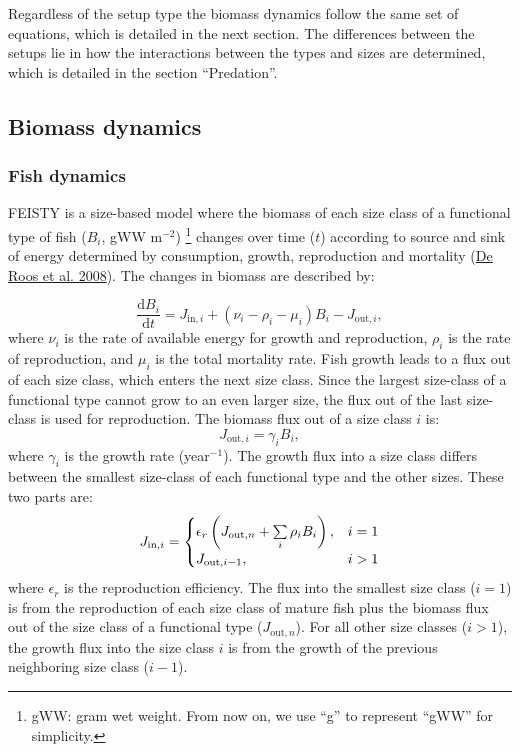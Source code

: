 \documentclass[
]{article}
\begin{document}
Regardless of the setup type the biomass dynamics follow the same set of
equations, which is detailed in the next section. The differences
between the setups lie in how the interactions between the types and
sizes are determined, which is detailed in the section ``Predation''.

\hypertarget{biomass-dynamics}{%
\subsection{Biomass dynamics}\label{biomass-dynamics}}

\hypertarget{fish-dynamics}{%
\subsubsection{Fish dynamics}\label{fish-dynamics}}

FEISTY is a size-based model where the biomass of each size class of a
functional type of fish (\(B_i\), gWW m\(^{-2}\)) \footnote{gWW: gram
  wet weight. From now on, we use ``g'' to represent ``gWW'' for
  simplicity.} changes over time (\(t\)) according to source and sink of
energy determined by consumption, growth, reproduction and mortality
(\protect\hyperlink{ref-deRoos2008}{De Roos et al. 2008}). The changes
in biomass are described by:

\begin{equation}
\dfrac{\mathrm{d}B_{i}}{\mathrm{d}t} =  J_{\mathrm{in},i}  + (\nu_{i} - \rho_i -\mu_i)B_i - J_{\mathrm{out},i},
\end{equation} where \(\nu_{i}\) is the rate of available energy for
growth and reproduction, \(\rho_i\) is the rate of reproduction, and
\(\mu_i\) is the total mortality rate. Fish growth leads to a flux out
of each size class, which enters the next size class. Since the largest
size-class of a functional type cannot grow to an even larger size, the
flux out of the last size-class is used for reproduction. The biomass
flux out of a size class \(i\) is: \begin{equation}
J_{\mathrm{out},i} = \gamma_i B_i,
\end{equation} where \(\gamma_i\) is the growth rate (year\(^{-1}\)).
The growth flux into a size class differs between the smallest
size-class of each functional type and the other sizes. These two parts
are: \begin{equation}
    J_{\mathrm{in},i} =
  \begin{cases}
\epsilon_r \left(  J_{\mathrm{out},n} + \sum\limits_i \rho_i B_i \right),      & \text{$ i=1 $} \\
     J_{\mathrm{out},i-1}, & \text{$ i > 1$} 
  \end{cases}
\end{equation} where \(\epsilon_r\) is the reproduction efficiency. The
flux into the smallest size class (\(i=1\)) is from the reproduction of
each size class of mature fish plus the biomass flux out of the size
class of a functional type (\(J_{\mathrm{out},n}\)). For all other size
classes (\(i > 1\)), the growth flux into the size class \(i\) is from
the growth of the previous neighboring size class (\(i-1\)).
\end{document}
